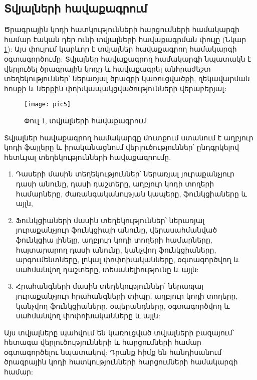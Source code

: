 {
    \subsection{Տվյալների հավաքագրում}\label{subsec:dataCollection}
    Ծրագրային կոդի հատկությունների հարցումների համակարգի համար էական դեր ունի տվյալների հավաքագրման փուլը
    (Նկար \ref{fig:figure5}): Այս փուլում  կարևոր է տվյալներ հավաքագրող համակարգի
    օգտագործումը: Տվյալներ հավաքագրող համակարգի նպատակն է վերլուծել ծրագրային կոդը և հավաքագրել անհրաժեշտ
    տեղեկություններ՝ ներառյալ ծրագրի կառուցվածքի, ղեկավարման հոսքի և ներքին փոխկապակցվածությունների վերաբերյալ։

    \begin{figure}[h]
        \centering
        \texttt{[image: pic5]}
        \caption{Փուլ 1, տվյալների հավաքագրում}
        \label{fig:figure5}
    \end{figure}

    Տվյալներ հավաքագրող համակարգը մուտքում ստանում է աղբյուր կոդի ֆայլերը և իրականացնում վերլուծություններ՝
    ընդգրկելով հետևյալ տեղեկությունների հավաքագրումը.
    \begin{enumerate}
        \item Դասերի մասին տեղեկություններ՝ ներառյալ յուրաքանչյուր դասի անունը, դասի դաշտերը,
        աղբյուր կոդի տողերի համարները, ժառանգականության կապերը, ֆունկցիաները և այլն,
        \item Ֆունկցիաների մասին տեղեկություններ՝ ներառյալ յուրաքանչյուր ֆունկցիայի անունը, վերասահմանված ֆունկցիա լինելը,
        աղբյուր կոդի տողերի համարները, հայտարարող դասի անունը, կանչվող ֆունկցիաները, արգումենտները, լոկալ փոփոխականները,
        օգտագործվող և սահմանվող դաշտերը, տեսանելիությունը և այլն:
        \item Հրահանգների մասին տեղեկություններ՝ ներառյալ յուրաքանչյուր հրահանգների տիպը, աղբյուր կոդի տողերը,
        կանչվող ֆունկցիաները, օպերանդները, օգտագործվող և սահմանվող փոփոխականները և այլն:
    \end{enumerate}

    Այս տվյալները պահվում են կառուցված տվյալների բազայում՝ հետագա վերլուծությունների և հարցումների համար
    օգտագործելու նպատակով: Դրանք հիմք են հանդիսանում ծրագրային կոդի հատկությունների հարցումների համակարգի համար:

    

%    
}